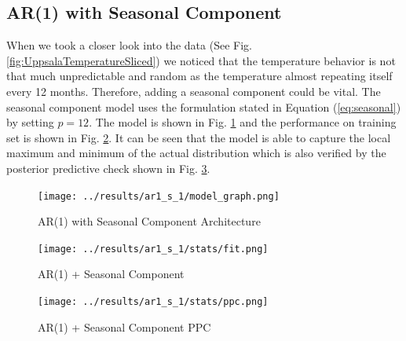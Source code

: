 \documentclass{IEEEtran}
\begin{document}
  \subsection{AR(1) with Seasonal Component}
  When we took a closer look into the data (See Fig. \ref{fig:UppsalaTemperatureSliced}) we noticed that the temperature behavior is not that much unpredictable and random as the temperature almost repeating itself every 12 months. Therefore, adding a seasonal component could be vital. The seasonal component model uses the formulation stated in Equation (\ref{eq:seasonal}) by setting $p=12$. The model is shown in Fig. \ref{fig:ar1_seasonal_model} and the performance on training set is shown in Fig. \ref{fig:ar1_seasonal_fit}. It can be seen that the model is able to capture the local maximum and minimum of the actual distribution which is also verified by the posterior predictive check shown in Fig. \ref{fig:ar1_seasonal_ppc}.
  \begin{figure}[ht!]
    \begin{center}
      \texttt{[image: ../results/ar1\_s\_1/model\_graph.png]}
    \end{center}
    \caption{AR(1) with Seasonal Component Architecture}\label{fig:ar1_seasonal_model}
  \end{figure}
  \begin{figure}
    \begin{center}
      \texttt{[image: ../results/ar1\_s\_1/stats/fit.png]}
    \end{center}
    \caption{AR(1) + Seasonal Component}\label{fig:ar1_seasonal_fit}
  \end{figure}
  \begin{figure}
    \begin{center}
      \texttt{[image: ../results/ar1\_s\_1/stats/ppc.png]}
          \end{center}
          \caption{AR(1) + Seasonal Component PPC}\label{fig:ar1_seasonal_ppc}
  \end{figure}
\end{document}
